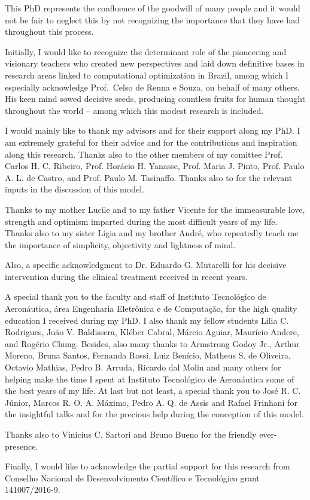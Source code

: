 This PhD represents the confluence of the goodwill of many people and it would not be fair to neglect this by not recognizing the importance that they have had throughout this process. 

Initially, I would like to recognize the determinant role of the pioneering and visionary teachers who created new perspectives and laid down definitive bases in research areas linked to
computational optimization in Brazil, among which I especially acknowledge Prof.~Celso de Renna e Souza, on behalf of many others. 
His keen mind sowed decisive seeds, producing countless fruits for human thought throughout the world -- among which this modest research is included.

I would mainly like to thank my advisors  and  for their support along my PhD. I am extremely grateful for their advice and for the contributions and inspiration along this research. Thanks also to the other members of my comittee  %
Prof. Carlos H. C. Ribeiro, %
Prof. Hor\'{a}cio H. Yanasse, 
Prof. Maria J. Pinto,
Prof. Paulo A. L. de Castro,
and
Prof. Paulo M. Tasinaffo.
Thanks also to 
 for the relevant inputs in the discussion of this model.

Thanks to my mother Lucile and to my father Vicente for the immeasurable love, strength and optimism imparted during the most difficult years of my life. Thanks also to my sister L\'{i}gia and my brother Andr\'{e}, who repeatedly teach me the importance of simplicity, objectivity and lightness of mind.

Also, a specific acknowledgment to Dr. Eduardo G. Mutarelli for his decisive intervention during the clinical treatment received in recent years.

A special thank you to the faculty and staff of Instituto Tecnol\'{o}gico de Aeron\'{a}utica, \'{a}rea Engenharia Eletr\^{o}nica e de Computa\c{c}\~{a}o, for the high quality education I received during my PhD. I also thank my fellow students 
Lilia C. Rodrigues, 
Jo\~{a}o V. Baldissera,
Kl\'{e}ber Cabral, 
M\'{a}rcio Aguiar, 
Maur\'{i}cio Andere, 
and
Rog\'{e}rio Chung. 
%
Besides, also many thanks to 
Armstrong Godoy Jr., 
Arthur Moreno,
Bruna Santos,
Fernanda Rossi, 
Luiz Ben\'{i}cio,
Matheus S. de Oliveira,
Octavio Mathias, 
Pedro B. Arruda, 
Ricardo dal Molin 
and many others for helping make the time I spent at Instituto Tecnol\'{o}gico de Aeron\'{a}utica some of the best years of my life. 
At last but not least, a special thank you to 
{Jos\'{e} R. C. J\'{u}nior}, 
{Marcos R. O. A. M\'{a}ximo},
{Pedro A. Q. de Assis} 
and
{Rafael Frinhani} 
for the insightful talks and for the precious help during the conception of this model.

Thanks also to {Vinicius C. Sartori} and Bruno Bueno for the friendly ever-presence.

Finally, I would like to acknowledge the partial support for this research from Conselho Nacional de Desenvolvimento Cient\'{i}fico e Tecnol\'{o}gico grant 141007/2016-9. 